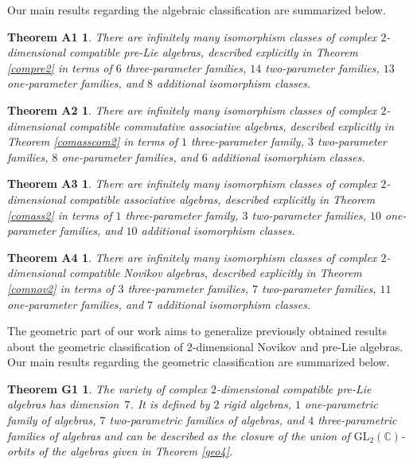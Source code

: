 \documentclass[10pt,a4paper]{amsart}
\numberwithin{equation}{section}
\newtheorem*{theoremA1}{Theorem A1}
\newtheorem*{theoremA2}{Theorem A2}
\newtheorem*{theoremA3}{Theorem A3}
\newtheorem*{theoremA4}{Theorem A4}
\newtheorem*{theoremG1}{Theorem G1}
\begin{document}
Our main results regarding the algebraic classification are summarized below.

\begin{theoremA1}
There are infinitely many isomorphism classes of complex
$2$-dimensional compatible pre-Lie algebras, described explicitly in
 Theorem {\rm\ref{compre2}}
 in terms of
$6$ three-parameter families,
$14$ two-parameter families,
$13$ one-parameter families,
and
$8$ additional isomorphism classes.
\end{theoremA1}

\begin{theoremA2}
There are infinitely many isomorphism classes of complex
$2$-dimensional compatible commutative associative algebras, described explicitly in
 Theorem {\rm\ref{comasscom2}}
 in terms of
$1$ three-parameter family,
$3$ two-parameter families,
$8$ one-parameter families,
and
$6$ additional isomorphism classes.
\end{theoremA2}

\begin{theoremA3}
There are infinitely many isomorphism classes of complex
$2$-dimensional compatible associative algebras, described explicitly in
 Theorem {\rm\ref{comass2}}
 in terms of
$1$ three-parameter family,
$3$ two-parameter families,
$10$ one-parameter families,
and
$10$ additional isomorphism classes.
\end{theoremA3}

\begin{theoremA4}
There are infinitely many isomorphism classes of complex
$2$-dimensional compatible Novikov algebras, described explicitly in
 Theorem {\rm\ref{comnov2}}
 in terms of
$3$ three-parameter families,
$7$ two-parameter families,
$11$ one-parameter families,
and
$7$ additional isomorphism classes.
\end{theoremA4}

The geometric part of our work aims to generalize previously obtained results about the geometric classification of $2$-dimensional Novikov \cite{BB14} and pre-Lie \cite{BB09} algebras. Our main results regarding the geometric classification are summarized below.

\begin{theoremG1}
The variety of complex $2$-dimensional compatible pre-Lie algebras has dimension~$7$.
It is defined by $2$ rigid algebras,
$1$ one-parametric family of algebras,
$7$ two-parametric families of algebras,
and $4$ three-parametric families of algebras and can be described as the closure of the union of $\mathrm{GL}_2(\mathbb{C})$-orbits of the algebras given in Theorem {\rm\ref{geo4}}.
\end{theoremG1}
\end{document}
